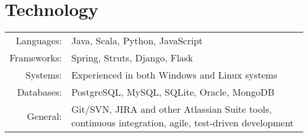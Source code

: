 \section{Technology}

\begin{tabular}{r|p{11cm}}
	Languages: & Java, Scala, Python, JavaScript \\
	Frameworks: & Spring, Struts, Django, Flask \\
	Systems: & Experienced in both Windows and Linux systems \\
	Databases: & PostgreSQL, MySQL, SQLite, Oracle, MongoDB \\
	General: & Git/SVN, JIRA and other Atlassian Suite tools, continuous integration, agile, test-driven development \\
\end{tabular}